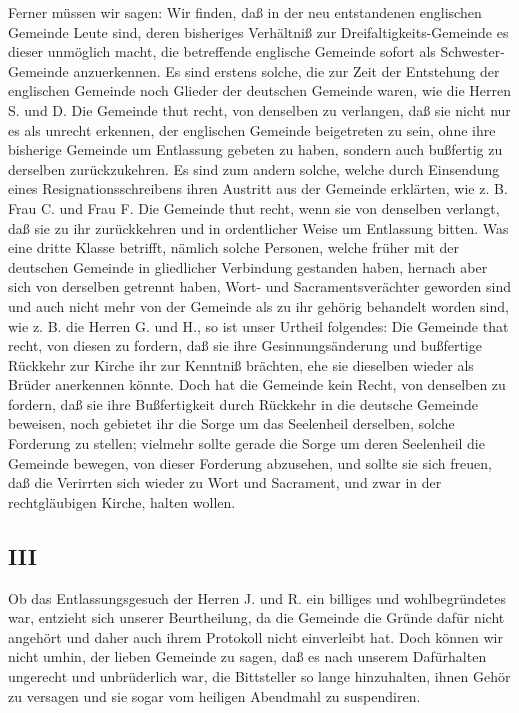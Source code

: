 Ferner müssen wir sagen: Wir finden, daß in der neu entstandenen englischen Gemeinde Leute sind, deren bisheriges Verhältniß zur
Dreifaltigkeits-Gemeinde es dieser unmöglich macht, die betreffende englische Gemeinde sofort als Schwester-Gemeinde anzuerkennen. Es sind erstens solche, die zur Zeit der Entstehung der englischen Gemeinde noch Glieder der deutschen Gemeinde waren, wie die Herren S. und D. Die Gemeinde thut recht, von denselben zu verlangen, daß sie nicht nur es als unrecht erkennen, der englischen Gemeinde beigetreten zu sein, ohne ihre bisherige Gemeinde um Entlassung gebeten zu haben, sondern auch bußfertig zu derselben zurückzukehren. Es sind zum andern solche, welche durch Einsendung eines Resignationsschreibens ihren Austritt aus der Gemeinde erklärten, wie z. B. Frau C. und Frau F. Die Gemeinde thut recht, wenn sie von denselben verlangt, daß sie zu ihr zurückkehren und in ordentlicher Weise um Entlassung bitten. Was eine dritte Klasse betrifft, nämlich solche Personen, welche früher mit der deutschen Gemeinde in gliedlicher Verbindung gestanden haben, hernach aber sich von derselben getrennt haben, Wort- und Sacramentsverächter geworden sind und auch nicht mehr von der Gemeinde als zu ihr gehörig behandelt worden sind, wie z. B. die Herren G. und H., so ist unser Urtheil folgendes: Die Gemeinde that recht, von diesen zu fordern, daß sie ihre Gesinnungsänderung und bußfertige Rückkehr zur Kirche ihr zur Kenntniß brächten, ehe sie dieselben wieder als Brüder anerkennen könnte. Doch hat die Gemeinde kein Recht, von denselben zu fordern, daß sie ihre Bußfertigkeit durch Rückkehr in die deutsche Gemeinde beweisen, noch gebietet ihr die Sorge um das Seelenheil derselben, solche Forderung zu stellen; vielmehr sollte gerade die Sorge um deren Seelenheil die Gemeinde bewegen, von dieser Forderung abzusehen, und sollte sie sich freuen, daß die Verirrten sich wieder zu Wort und Sacrament, und zwar in der rechtgläubigen Kirche, halten wollen.

\subsection{III}

Ob das Entlassungsgesuch der Herren J. und R. ein billiges und wohlbegründetes war, entzieht sich unserer Beurtheilung, da die Gemeinde die Gründe dafür nicht angehört und daher auch ihrem Protokoll nicht einverleibt hat. Doch können wir nicht umhin, der lieben Gemeinde zu sagen, daß es nach unserem Dafürhalten ungerecht und unbrüderlich war, die Bittsteller so lange hinzuhalten, ihnen Gehör zu versagen und sie sogar vom heiligen Abendmahl zu suspendiren.

